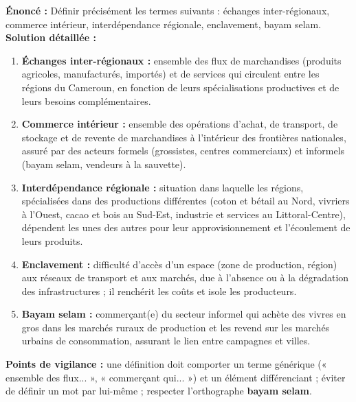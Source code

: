 \documentclass[11pt]{article}
\begin{document}
\begin{corrige}
\textbf{Énoncé :} Définir précisément les termes suivants : échanges inter-régionaux, commerce intérieur, interdépendance régionale, enclavement, bayam selam.
\tcblower
\textbf{Solution détaillée :}
\begin{enumerate}
    \item \textbf{Échanges inter-régionaux :} ensemble des flux de marchandises (produits agricoles, manufacturés, importés) et de services qui circulent entre les régions du Cameroun, en fonction de leurs spécialisations productives et de leurs besoins complémentaires.
    \item \textbf{Commerce intérieur :} ensemble des opérations d'achat, de transport, de stockage et de revente de marchandises à l'intérieur des frontières nationales, assuré par des acteurs formels (grossistes, centres commerciaux) et informels (bayam selam, vendeurs à la sauvette).
    \item \textbf{Interdépendance régionale :} situation dans laquelle les régions, spécialisées dans des productions différentes (coton et bétail au Nord, vivriers à l'Ouest, cacao et bois au Sud-Est, industrie et services au Littoral-Centre), dépendent les unes des autres pour leur approvisionnement et l'écoulement de leurs produits.
    \item \textbf{Enclavement :} difficulté d'accès d'un espace (zone de production, région) aux réseaux de transport et aux marchés, due à l'absence ou à la dégradation des infrastructures ; il renchérit les coûts et isole les producteurs.
    \item \textbf{Bayam selam :} commerçant(e) du secteur informel qui achète des vivres en gros dans les marchés ruraux de production et les revend sur les marchés urbains de consommation, assurant le lien entre campagnes et villes.
\end{enumerate}

\textbf{Points de vigilance :} une définition doit comporter un terme générique (« ensemble des flux... », « commerçant qui... ») et un élément différenciant ; éviter de définir un mot par lui-même ; respecter l'orthographe \textbf{bayam selam}.
\end{corrige}
\end{document}
